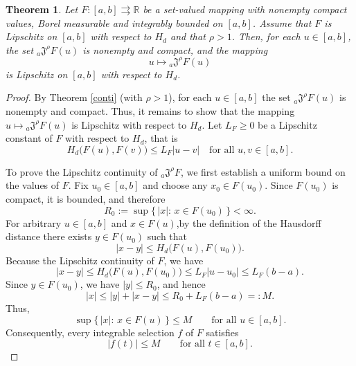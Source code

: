 \documentclass[a4paper,12pt,reqno]{amsart}
\numberwithin{equation}{section}
\newtheorem{theorem}{Theorem}[section]
\theoremstyle{definition}
\theoremstyle{remark}
\numberwithin{equation}{section}
\begin{document}
\begin{theorem} \label{LP}
Let $F:[a,b]\rightrightarrows\mathbb{R}$ be a set-valued mapping with nonempty compact values, Borel measurable and integrably bounded on $[a,b]$.
Assume that $F$ is Lipschitz on $[a,b]$ with respect to $H_d$ and that $\rho>1$. Then, for each $u\in[a,b]$, the set ${}_{a}\mathfrak{J}^{\rho}F(u)$ is nonempty and compact, and the mapping
\[
u \longmapsto {}_{a}\mathfrak{J}^{\rho}F(u)
\]
is Lipschitz on $[a,b]$ with respect to $H_d$.
\end{theorem}
    \begin{proof}
By Theorem \ref{conti} (with $\rho>1$), for each $u\in[a,b]$ the set ${}_{a}\mathfrak{J}^{\rho}F(u)$ is nonempty and compact. Thus, it remains to show that the mapping $u\mapsto{}_{a}\mathfrak{J}^{\rho}F(u)$ is Lipschitz with respect to $H_d$.     
Let $L_F\ge0$ be a Lipschitz constant of $F$ with respect to $H_d$, that is
$$H_d\big(F(u),F(v)\big)\le L_F|u-v|
\quad\text{for all }u,v\in[a,b].$$


To prove the Lipschitz continuity of ${}_{a}\mathfrak{J}^{\rho}F$, we first  establish a uniform bound on the values of $F$. Fix $u_{0}\in[a,b]$ and  choose any $x_{0}\in F(u_{0})$. Since $F(u_{0})$ is compact, it is bounded,  and therefore 
\[
R_{0}:=\sup\{\,|x|:\,x\in F(u_{0})\,\}<\infty.
\]
For arbitrary $u\in[a,b]$ and $x\in F(u)$,by the definition
of the Hausdorff distance there exists $y\in F(u_0)$ such that
$$|x-y|\le H_d\big(F(u),F(u_0)\big).$$
Because the Lipschitz continuity of $F$, we have
$$|x-y|\le H_d\big(F(u),F(u_0)\big)\le L_F|u-u_0|\le L_F(b-a).$$
Since $y\in F(u_{0})$, we have $|y|\le R_{0}$, and hence
\[
|x|\le |y|+|x-y|\le R_{0}+L_{F}(b-a)=:M.
\]
Thus,
\[
\sup\{\,|x|:\,x\in F(u)\,\}\le M
\qquad\text{for all }u\in[a,b].
\]
Consequently, every integrable selection $f$ of $F$ satisfies
\begin{equation}\label{EQ4}
|f(t)|\le M
\qquad\text{for all }t\in[a,b].
\end{equation}



\end{proof}
\end{document}
